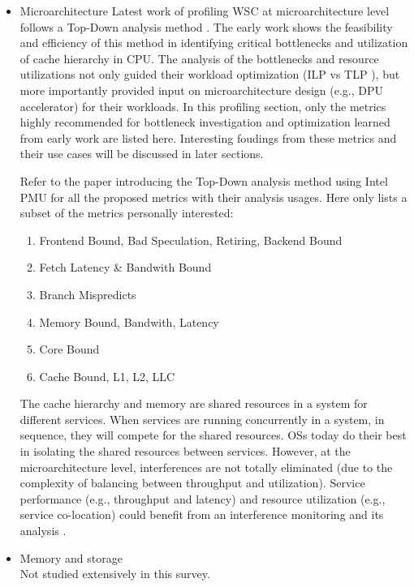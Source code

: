 \begin{itemize}
\begin{itemize}
\begin{itemize}
  \item Microarchitecture
    Latest work of profiling WSC at microarchitecture level \autocite{DBLP:conf/asplos/FerdmanAKVAJKPAF12, DBLP:journals/micro/KanevDHRMWB16} follows a Top-Down analysis method \autocite{DBLP:conf/ispass/Yasin14}. The early work shows the feasibility and efficiency of this method in identifying critical bottlenecks and utilization of cache hierarchy in CPU.
    The analysis of the bottlenecks and resource utilizations not only guided their workload optimization (ILP vs TLP \autocite{DBLP:journals/micro/KanevDHRMWB16}), but more importantly provided input on microarchitecture design (e.g., DPU accelerator) for their workloads.
    In this profiling section, only the metrics highly recommended for bottleneck investigation and optimization learned from early work are listed here. Interesting foudings from these metrics and their use cases will be discussed in later sections.

    Refer to the paper \autocite{DBLP:conf/ispass/Yasin14} introducing the Top-Down analysis method using Intel PMU for all the proposed metrics with their analysis usages. Here only lists a subset of the metrics personally interested:
    \begin{enumerate}
      \item Frontend Bound, Bad Speculation, Retiring, Backend Bound
      \item Fetch Latency & Bandwith Bound
      \item Branch Mispredicts
      \item Memory Bound, Bandwith, Latency
      \item Core Bound
      \item Cache Bound, L1, L2, LLC
    \end{enumerate}

    The cache hierarchy and memory are shared resources in a system for different services. When services are running concurrently in a system, in sequence, they will compete for the shared resources. OSs today do their best in isolating the shared resources between services. However, at the microarchitecture level, interferences are not totally eliminated (due to the complexity of balancing between throughput and utilization).
    Service performance (e.g., throughput and latency) \autocite{DBLP:conf/asplos/FerdmanAKVAJKPAF12} and resource utilization (e.g., service co-location) could benefit from an interference monitoring and its analysis \autocite{DBLP:conf/isca/LoCGRK15}.

  \item Memory and storage\\
    Not studied extensively in this survey.
  \end{itemize}
 \end{itemize}
 \end{itemize}
